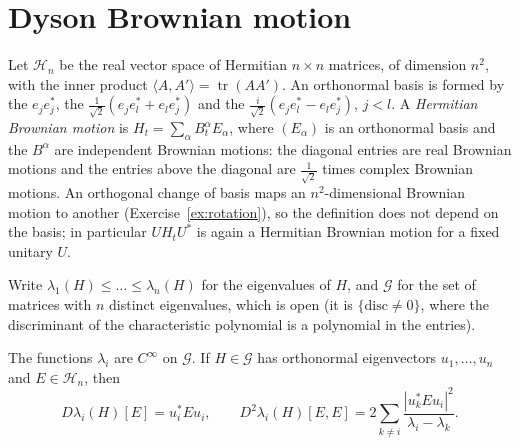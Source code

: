 \section{Dyson Brownian motion}

Let $\mathcal H_n$ be the real vector space of Hermitian $n\times n$ matrices, of dimension $n^2$, with the inner product $\langle A,A'\rangle=\operatorname{tr}(AA')$. An orthonormal basis is formed by the
$e_je_j^*$, the $\frac1{\sqrt2}(e_je_l^*+e_le_j^*)$ and the $\frac{i}{\sqrt2}(e_je_l^*-e_le_j^*)$, $j<l$. A \emph{Hermitian Brownian motion} is $H_t=\sum_\alpha B^\alpha_tE_\alpha$, where $(E_\alpha)$ is an orthonormal
basis and the $B^\alpha$ are independent Brownian motions: the diagonal entries are real Brownian motions and the entries above the diagonal are $\frac1{\sqrt2}$ times complex Brownian motions. An orthogonal change
of basis maps an $n^2$-dimensional Brownian motion to another (Exercise~\ref{ex:rotation}), so the definition does not depend on the basis; in particular $UH_tU^*$ is again a Hermitian Brownian motion for a fixed
unitary $U$.

Write $\lambda_1(H)\le\dots\le\lambda_n(H)$ for the eigenvalues of $H$, and $\mathcal G$ for the set of matrices with $n$ distinct eigenvalues, which is open (it is $\{\mathrm{disc}\ne0\}$, where the
discriminant of the characteristic polynomial is a polynomial in the entries).

\begin{lemma}\label{lem:perturb}
The functions $\lambda_i$ are $C^\infty$ on $\mathcal G$. If $H\in\mathcal G$ has orthonormal eigenvectors $u_1,\dots,u_n$ and $E\in\mathcal H_n$, then
\[
D\lambda_i(H)[E]=u_i^*Eu_i,\qquad D^2\lambda_i(H)[E,E]=2\sum_{k\ne i}\frac{|u_k^*Eu_i|^2}{\lambda_i-\lambda_k}.
\]
\end{lemma}

